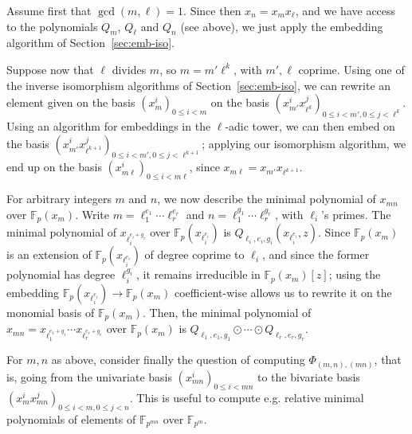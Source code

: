 \documentclass{sig-alternate}
\def\F {\ensuremath{\mathbb{F}}}
\newcounter{algo}
\begin{document}
Assume first that $\gcd(m,\ell)=1$. Since then $x_n = x_m x_\ell$, and
we have access to the polynomials $Q_m$, $Q_\ell$ and $Q_n$ (see
above), we just apply the embedding algorithm of
Section~\ref{sec:emb-iso}.

Suppose now that $\ell$ divides $m$, so $m=m'\ell^k$, with $m',\ell$
coprime. Using one of the inverse isomorphism algorithms of
Section~\ref{sec:emb-iso}, we can rewrite an element given on the
basis $(x_m^i)_{0 \le i < m}$ on the basis $(x_{m'}^i x_{\ell^k}^j)_{0
  \le i < m', 0 \le j < \ell^k}$. Using an algorithm for embeddings in
the $\ell$-adic tower, we can then embed on the basis $(x_{m'}^i
x_{\ell^{k+1}}^j)_{0 \le i < m', 0 \le j < \ell^{k+1}}$; applying our
isomorphism algorithm, we end up on the basis $(x_{m\ell}^i)_{0 \le i
  < m \ell}$, since $x_{m \ell} = x_{m'} x_{\ell^{k+1}}$.

\smallskip{}  For
arbitrary integers $m$ and $n$, we now describe the minimal polynomial
of $x_{mn}$ over $\F_p(x_m)$. Write $m=\ell_1^{e_1}\cdots
\ell_r^{e_r}$ and $n=\ell_1^{g_1}\cdots\ell_r^{g_r}$, with $\ell_i$'s
primes. The minimal polynomial of $x_{\ell_i^{e_i+g_i}}$ over
$\F_p(x_{\ell_i^{e_i}})$ is $Q_{\ell_i,e_i,g_i}(x_{\ell_i^{e_i}},z)$.
Since $\F_p(x_m)$ is an extension of $\F_p(x_{\ell_i^{e_i}})$ of
degree coprime to $\ell_i$, and since the former polynomial has degree
$\ell_i^{g_i}$, it remains irreducible in $\F_p(x_m)[z]$; using the
embedding $\F_p(x_{\ell_i^{e_i}}) \to \F_p(x_m)$ coefficient-wise
allows us to rewrite it on the monomial basis of $\F_p(x_m)$. Then,
the minimal polynomial of $x_{mn} = x_{\ell_1^{e_1+g_1}}\cdots
x_{\ell_r^{e_r+g_r}}$ over $\F_p(x_m)$ is $Q_{\ell_1,e_1,g_1} \odot
\cdots \odot Q_{\ell_r,e_r,g_r}$.

\smallskip{} For $m,n$ as above,
consider finally the question of computing $\Phi_{(m,n),(mn)}$, that
is, going from the univariate basis $(x_{mn}^i)_{0 \le i < mn}$ to the
bivariate basis \sloppy $(x_m^i x_{mn}^j)_{0 \le i < m, 0 \le j < n}$. This is
useful to compute e.g.  relative minimal polynomials of elements of
$\F_{p^{mn}}$ over $\F_{p^m}$.
\end{document}
